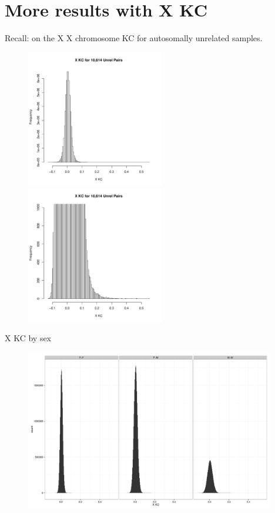 \documentclass{beamer}
\begin{document}
\section[]{More results with X KC}
\begin{frame}{Recall: on the X}
X chromosome KC for autosomally unrelated samples.
\begin{figure}
\includegraphics[height=6cm]{../xkc_unrel_hist.pdf}
\includegraphics[height=6cm]{../xkc_unrel_hist_trunc.pdf}
\end{figure}
\end{frame}

\begin{frame}{X KC by sex}
\begin{figure}
\includegraphics[height=7cm]{xkc_unrel_hist_bySexPair.pdf}
\end{figure}
\end{frame}
\end{document}
